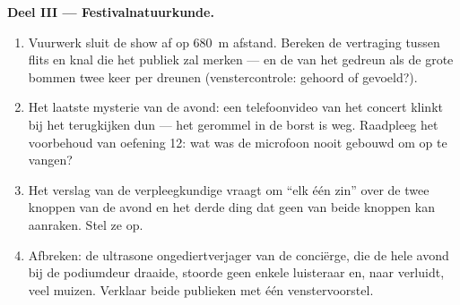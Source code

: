 \begin{problem}
\medskip\noindent\textbf{Deel III --- Festivalnatuurkunde.}
\begin{enumerate}[resume]
  \item Vuurwerk sluit de show af op \qty{680}{m} afstand. Bereken de
        vertraging tussen flits en knal die het publiek zal merken ---
        en de  van het gedreun als de grote bommen twee
        keer per  dreunen (venstercontrole: gehoord of
        gevoeld?).
  \item Het laatste mysterie van de avond: een telefoonvideo van het
        concert klinkt bij het terugkijken dun --- het gerommel in
        de borst is weg. Raadpleeg het voorbehoud van oefening 12: wat
        was de microfoon nooit gebouwd om op te vangen?
  \item Het verslag van de verpleegkundige vraagt om ``elk één zin''
        over de twee knoppen van de avond en het derde ding dat geen
        van beide knoppen kan aanraken. Stel ze op.
  \item Afbreken: de ultrasone ongediertverjager van de conciërge, die
        de hele avond bij de podiumdeur draaide, stoorde geen enkele
        luisteraar en, naar verluidt, veel muizen. Verklaar beide
        publieken met één venstervoorstel.
\end{enumerate}
\end{problem}
